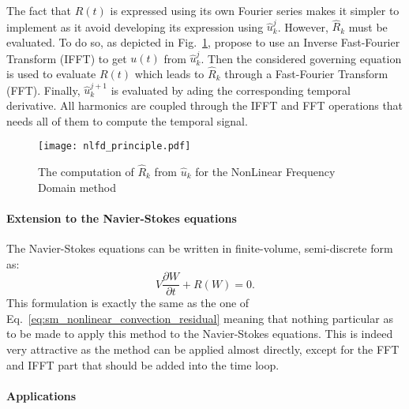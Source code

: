 The fact that $R(t)$ is expressed using its own Fourier series 
makes it simpler to implement 
as it avoid developing its expression using $\widehat{u}_k^j$.
However, $\widehat{R}_k$ must be evaluated. To do so, as depicted
in Fig.~\ref{fig:nlfd_principle}, \citet{McMullen2001}
propose to use an Inverse Fast-Fourier Transform (IFFT) to get
$u(t)$ from $\widehat{u}_k^j$. Then the considered governing equation
is used to evaluate $R(t)$ which leads to $\widehat{R}_k$
through a Fast-Fourier Transform (FFT). Finally, $\widehat{u}_k^{j+1}$
is evaluated by ading the corresponding temporal derivative. All
harmonics are coupled through the IFFT and FFT operations
that needs all of them to compute the temporal signal.
\begin{figure}[htbp]
  \centering
  \texttt{[image: nlfd\_principle.pdf]}
  \caption{The computation of $\widehat{R}_k$ from $\widehat{u}_k$
  for the NonLinear Frequency Domain method}
  \label{fig:nlfd_principle}
\end{figure}

\paragraph{Extension to the Navier-Stokes equations}
The Navier-Stokes equations can be written in finite-volume,
semi-discrete form as:
\begin{equation}
	V \frac{\partial W}{\partial t} + R(W) = 0.
	\label{eq:navier_stokes_fv_sd}
\end{equation}
This formulation is exactly the same as the one of 
Eq.~\ref{eq:sm_nonlinear_convection_residual} meaning that
nothing particular as to be made to apply this method to
the Navier-Stokes equations. This is indeed very attractive as the
method can be applied almost directly, except for the FFT and IFFT
part that should be added into the time loop.

\paragraph{Applications}


